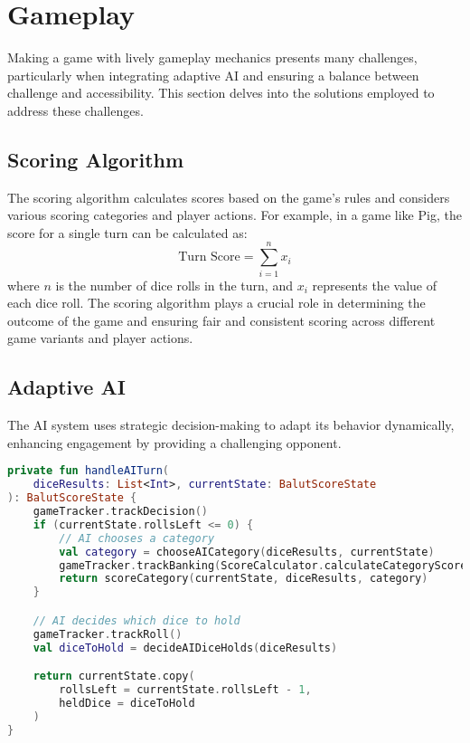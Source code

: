 \section{Gameplay}

Making a game with lively gameplay mechanics presents many challenges, particularly when integrating adaptive AI and ensuring a balance between challenge and accessibility. This section delves into the solutions employed to address these challenges.

\subsection{Scoring Algorithm}

The scoring algorithm calculates scores based on the game's rules and considers various scoring categories and player actions. 
For example, in a game like Pig, the score for a single turn can be calculated as:
\begin{equation}
\text{Turn Score} = \sum_{i=1}^{n} x_i
\end{equation}
where $n$ is the number of dice rolls in the turn, and $x_i$ represents the value of each dice roll.
The scoring algorithm plays a crucial role in determining the outcome of the game and ensuring fair and consistent scoring across different game variants and player actions.

\subsection{Adaptive AI}

The AI system uses strategic decision-making to adapt its behavior dynamically, enhancing engagement by providing a challenging opponent.
\begin{lstlisting}[language=Kotlin, caption={handleAITurn Function}, label=lst:ai_turn_function]
private fun handleAITurn(
    diceResults: List<Int>, currentState: BalutScoreState
): BalutScoreState {
    gameTracker.trackDecision()
    if (currentState.rollsLeft <= 0) {
        // AI chooses a category
        val category = chooseAICategory(diceResults, currentState)
        gameTracker.trackBanking(ScoreCalculator.calculateCategoryScore(diceResults, category))
        return scoreCategory(currentState, diceResults, category)
    }

    // AI decides which dice to hold
    gameTracker.trackRoll()
    val diceToHold = decideAIDiceHolds(diceResults)

    return currentState.copy(
        rollsLeft = currentState.rollsLeft - 1,
        heldDice = diceToHold
    )
}
\end{lstlisting}
\label{lst:ai_turn_function}

